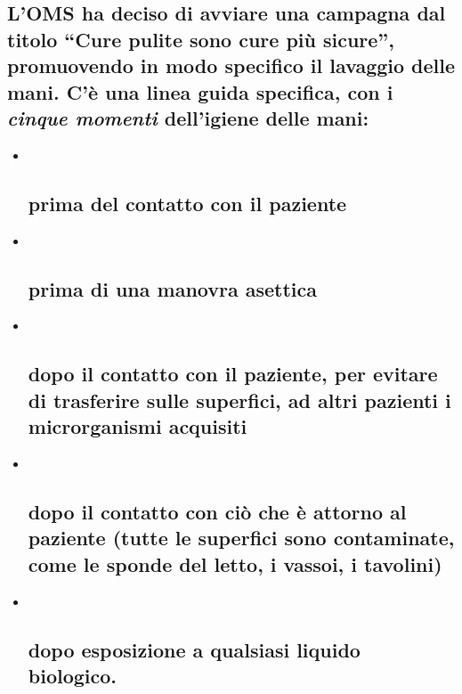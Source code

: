\documentclass[]{article}
\begin{document}
\subsection{\texorpdfstring{L'OMS ha deciso di avviare una campagna dal
titolo ``Cure pulite sono cure più sicure'', promuovendo in modo
specifico il \textbf{lavaggio delle mani}. C'è una \textbf{linea guida
specifica}, con i \emph{cinque momenti} dell'igiene delle
mani:}{L'OMS ha deciso di avviare una campagna dal titolo ``Cure pulite sono cure più sicure'', promuovendo in modo specifico il lavaggio delle mani. C'è una linea guida specifica, con i cinque momenti dell'igiene delle mani:}}\label{loms-ha-deciso-di-avviare-una-campagna-dal-titolo-cure-pulite-sono-cure-piuxf9-sicure-promuovendo-in-modo-specifico-il-lavaggio-delle-mani.-cuxe8-una-linea-guida-specifica-con-i-cinque-momenti-delligiene-delle-mani}

\begin{itemize}
\item ~
  \subsection{prima del contatto con il
  paziente}\label{prima-del-contatto-con-il-paziente}
\item ~
  \subsection{prima di una manovra
  asettica}\label{prima-di-una-manovra-asettica}
\item ~
  \subsection{dopo il contatto con il paziente, per evitare di
  trasferire sulle superfici, ad altri pazienti i microrganismi
  acquisiti}\label{dopo-il-contatto-con-il-paziente-per-evitare-di-trasferire-sulle-superfici-ad-altri-pazienti-i-microrganismi-acquisiti}
\item ~
  \subsection{dopo il contatto con ciò che è attorno al paziente (tutte
  le superfici sono contaminate, come le sponde del letto, i vassoi, i
  tavolini)}\label{dopo-il-contatto-con-ciuxf2-che-uxe8-attorno-al-paziente-tutte-le-superfici-sono-contaminate-come-le-sponde-del-letto-i-vassoi-i-tavolini}
\item ~
  \subsection{dopo esposizione a qualsiasi liquido
  biologico.}\label{dopo-esposizione-a-qualsiasi-liquido-biologico.}
\end{itemize}
\end{document}
